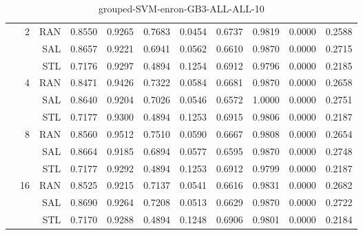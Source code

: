 \begin{center}
\begin{table}[htbp]
\begin{center}
\begin{tabular}{ | r | r | r | r | r | r | r | r | r | r | r |}
 & \multirow{3}{*}{2} & RAN & 0.8550 & 0.9265 & 0.7683 & 0.0454 & 0.6737 & 0.9819 & 0.0000 & 0.2588\\ \cline{3-11}
 &   & SAL & 0.8657 & 0.9221 & 0.6941 & 0.0562 & 0.6610 & 0.9870 & 0.0000 & 0.2715\\ \cline{3-11}
 &   & STL & 0.7176 & 0.9297 & 0.4894 & 0.1254 & 0.6912 & 0.9796 & 0.0000 & 0.2185\\ \cline{2-11}
 & \multirow{3}{*}{4} & RAN & 0.8471 & 0.9426 & 0.7322 & 0.0584 & 0.6681 & 0.9870 & 0.0000 & 0.2658\\ \cline{3-11}
 &   & SAL & 0.8640 & 0.9204 & 0.7026 & 0.0546 & 0.6572 & 1.0000 & 0.0000 & 0.2751\\ \cline{3-11}
 &   & STL & 0.7177 & 0.9300 & 0.4894 & 0.1253 & 0.6915 & 0.9806 & 0.0000 & 0.2187\\ \cline{2-11}
 & \multirow{3}{*}{8} & RAN & 0.8560 & 0.9512 & 0.7510 & 0.0590 & 0.6667 & 0.9808 & 0.0000 & 0.2654\\ \cline{3-11}
 &   & SAL & 0.8664 & 0.9185 & 0.6894 & 0.0577 & 0.6595 & 0.9870 & 0.0000 & 0.2748\\ \cline{3-11}
 &   & STL & 0.7177 & 0.9292 & 0.4894 & 0.1253 & 0.6912 & 0.9799 & 0.0000 & 0.2187\\ \cline{2-11}
 & \multirow{3}{*}{16} & RAN & 0.8525 & 0.9215 & 0.7137 & 0.0541 & 0.6616 & 0.9831 & 0.0000 & 0.2682\\ \cline{3-11}
 &   & SAL & 0.8690 & 0.9264 & 0.7208 & 0.0513 & 0.6629 & 0.9870 & 0.0000 & 0.2722\\ \cline{3-11}
 &   & STL & 0.7170 & 0.9288 & 0.4894 & 0.1248 & 0.6906 & 0.9801 & 0.0000 & 0.2184\\ \cline{2-11}
\hline
\end{tabular}
\caption{grouped-SVM-enron-GB3-ALL-ALL-10}
\end{center}
 \end{table}
\end{center}

